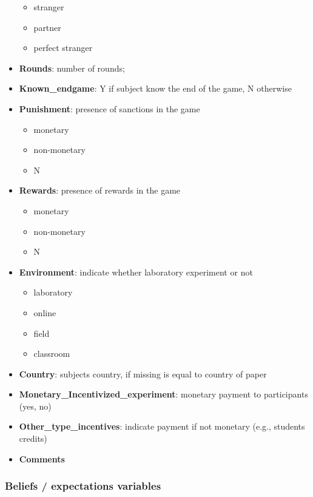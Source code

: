 \documentclass[
]{article}
\providecommand{\tightlist}{%
  \setlength{\itemsep}{0pt}\setlength{\parskip}{0pt}}
\begin{document}
\begin{itemize}
  \begin{itemize}
  \tightlist
  \item
    stranger
  \item
    partner
  \item
    perfect stranger
  \end{itemize}
\item
  \textbf{Rounds}: number of rounds;
\item
  \textbf{Known\_endgame}: Y if subject know the end of the game, N
  otherwise
\item
  \textbf{Punishment}: presence of sanctions in the game

  \begin{itemize}
  \tightlist
  \item
    monetary
  \item
    non-monetary
  \item
    N
  \end{itemize}
\item
  \textbf{Rewards}: presence of rewards in the game

  \begin{itemize}
  \tightlist
  \item
    monetary
  \item
    non-monetary
  \item
    N
  \end{itemize}
\item
  \textbf{Environment}: indicate whether laboratory experiment or not

  \begin{itemize}
  \tightlist
  \item
    laboratory
  \item
    online
  \item
    field
  \item
    classroom
  \end{itemize}
\item
  \textbf{Country}: subjects country, if missing is equal to country of
  paper
\item
  \textbf{Monetary\_Incentivized\_experiment}: monetary payment to
  participants (yes, no)
\item
  \textbf{Other\_type\_incentives}: indicate payment if not monetary
  (e.g., students credits)
\item
  \textbf{Comments}
\end{itemize}

\hypertarget{beliefs-expectations-variables}{%
\subsubsection{Beliefs / expectations
variables}\label{beliefs-expectations-variables}}
\end{document}
